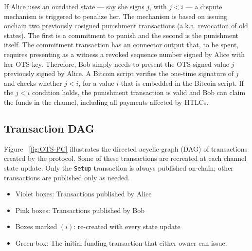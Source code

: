 \documentclass[11pt,a4paper]{article}
\newcommand{\txname}[1]{\texttt{#1}}
\begin{document}
If Alice uses an outdated state — say she signs $j$, with $j < i$ — a dispute mechanism is triggered to penalize her. The mechanism is based on issuing onchain two previously cosigned punishment transactions (a.k.a. revocation of old states). The first is a commitment to punish and the second is the punishment itself. The commitment transaction has an connector output that, to be spent, requires presenting as a witness a revoked sequence number signed by Alice with her OTS key. Therefore, Bob simply needs to present the OTS-signed value $j$ previously signed by Alice.  A Bitcoin script verifies the one-time signature of $j$ and checks whether $j < i$, for a value $i$ that is embedded in the Bitcoin script.  If the $j < i$ condition holds, the punishment transaction is valid and Bob can claim the funds in the channel, including all payments affected by HTLCs.


\subsection{Transaction DAG}
\label{dag}

Figure ~\ref{fig:OTS-PC} illustrates the directed acyclic graph (DAG) of transactions created by the protocol. Some of these transactions are recreated at each channel state update. Only the \txname{Setup} transaction is always published on-chain; other transactions are published only as needed.

\begin{itemize}
    \item Violet boxes: Transactions published by Alice
    \item Pink boxes: Transactions published by Bob
    \item Boxes marked $(i)$: re-created with every state update
    \item Green box: The initial funding transaction that either owner can issue.
\end{itemize}
\end{document}
